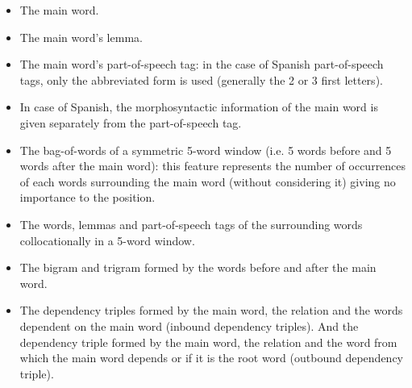 \begin{itemize}
  \item The main word.
  \item The main word's lemma.
  \item The main word's part-of-speech tag: in the case of Spanish
    part-of-speech tags, only the abbreviated form is used (generally the 2 or
    3 first letters).
  \item In case of Spanish, the morphosyntactic information of the main word is
    given separately from the part-of-speech tag.
  \item The bag-of-words of a symmetric 5-word window (i.e. 5 words before and
    5 words after the main word): this feature represents the number of
    occurrences of each words surrounding the main word (without considering
    it) giving no importance to the position.
  \item The words, lemmas and part-of-speech tags of the surrounding words
    collocationally in a 5-word window.
  \item The bigram and trigram formed by the words before and after the main
    word.
  \item The dependency triples formed by the main word, the relation and the
    words dependent on the main word (inbound dependency triples). And the
    dependency triple formed by the main word, the relation and the word from
    which the main word depends or if it is the root word (outbound dependency
    triple).
\end{itemize}

